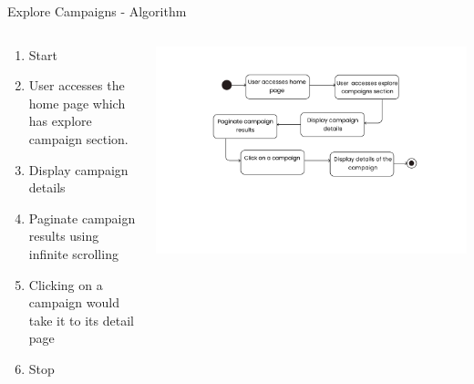 \documentclass{beamer}
\begin{document}
    
\begin{frame}{Explore Campaigns - Algorithm}
  \setlength{\itemsep}{4pt}
   \begin{columns}[T]
        \begin{column}{0.5\textwidth}
        \fontsize{10}{12}\selectfont
        \begin{enumerate}
              \item Start
            \item User accesses the home page which has explore campaign section.
            \item Display campaign details
            \item Paginate campaign results using infinite scrolling
            \item Clicking on a campaign would take it to its detail page
            \item Stop
        \end{enumerate}
        \end{column}
        \begin{column}{0.73\textwidth}
            \includegraphics[width=\linewidth]{assets/explore_state_chart.png} 
        \end{column}
    \end{columns}
    \end{frame}
\end{document}
